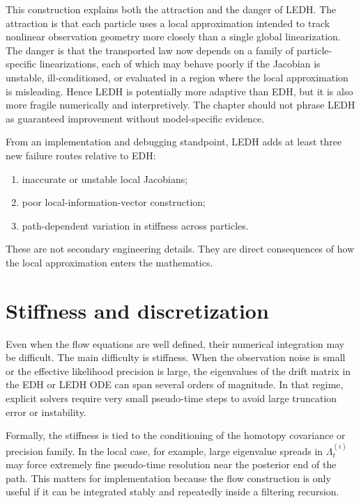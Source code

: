 This construction explains both the attraction and the danger of LEDH.  The
attraction is that each particle uses a local approximation intended to track
nonlinear observation geometry more closely than a single global
linearization.  The danger is that the transported law now depends on a family
of particle-specific linearizations, each of which may behave poorly if the
Jacobian is unstable, ill-conditioned, or evaluated in a region where the local
approximation is misleading.  Hence LEDH is potentially more adaptive than EDH,
but it is also more fragile numerically and interpretively.  The chapter should
not phrase LEDH as guaranteed improvement without model-specific evidence.

From an implementation and debugging standpoint, LEDH adds at least three new
failure routes relative to EDH:
\begin{enumerate}[label=(\roman*)]
  \item inaccurate or unstable local Jacobians;
  \item poor local-information-vector construction;
  \item path-dependent variation in stiffness across particles.
\end{enumerate}
These are not secondary engineering details.  They are direct consequences of
how the local approximation enters the mathematics.

\section{Stiffness and discretization}
\label{sec:bf-pff-stiffness}

Even when the flow equations are well defined, their numerical integration may
be difficult.  The main difficulty is stiffness.  When the observation noise is
small or the effective likelihood precision is large, the eigenvalues of the
drift matrix in the EDH or LEDH ODE can span several orders of magnitude.  In
that regime, explicit solvers require very small pseudo-time steps to avoid
large truncation error or instability.

Formally, the stiffness is tied to the conditioning of the homotopy covariance
or precision family.  In the local case, for example, large eigenvalue spreads
in $\Lambda_t^{(i)}$ may force extremely fine pseudo-time resolution near the
posterior end of the path.  This matters for implementation because the flow
construction is only useful if it can be integrated stably and repeatedly inside
a filtering recursion.

